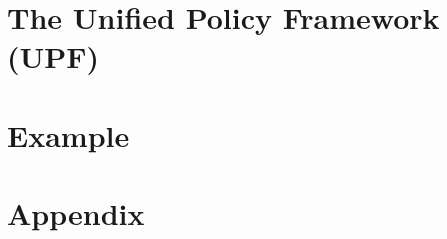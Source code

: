 \documentclass[11pt,DIV10,a4paper,twoside=semi,openright,titlepage]{scrreprt}
\begin{document}
\maketitle
\cleardoublepage
\pagestyle{plain}
\tableofcontents
\cleardoublepage


  \chapter{The Unified Policy Framework (UPF)}
  
  
  
  
  
  
  
  
  \chapter{Example}
  
  
  

  
\chapter{Appendix}




\nocite{brucker.ea:formal-fw-testing:2014,brucker.ea:hol-testgen-fw:2013,brucker.ea:theorem-prover:2012,brucker.ea:model-based:2011}
\nocite{bruegger:generation:2012}


\end{document}
